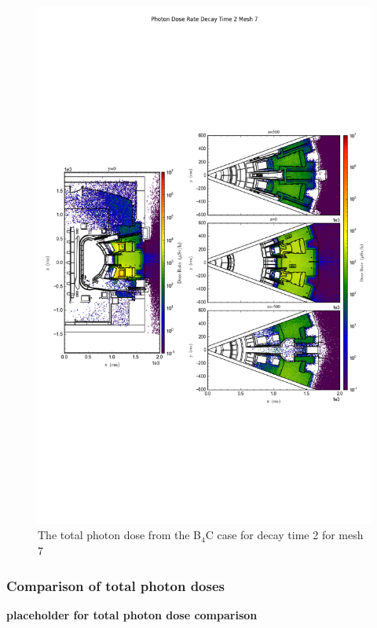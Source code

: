 \documentclass[12pt]{article}
\begin{document}
\begin{figure}[ht!]
\centering
\includegraphics[trim={0cm 9cm 0cm 10cm},clip,scale=0.75]{../plots/final_model/Photon_Dose_Rate_Decay_Time_2_Mesh_7.png}
\caption{The total photon dose from the B$_4$C case for decay time 2 for mesh 7}
\label{fig:ct_photons_dc2_no4bc_m7_flux}
\end{figure}

\newpage
\clearpage
\subsubsection{Comparison of total photon doses}
\textbf{placeholder for total photon dose comparison}
\newpage
\clearpage
\end{document}
